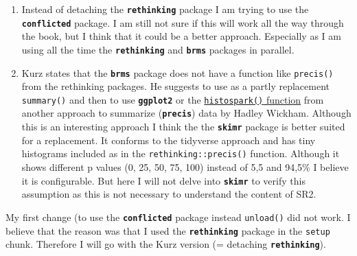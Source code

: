 \documentclass[
  letterpaper,
  DIV=11,
  numbers=noendperiod]{scrreprt}
\providecommand{\tightlist}{%
  \setlength{\itemsep}{0pt}\setlength{\parskip}{0pt}}\usepackage{longtable,booktabs,array}
\begin{document}
\begin{enumerate}
\def\labelenumi{\arabic{enumi}.}
\tightlist
\item
  Instead of detaching the \textbf{\texttt{rethinking}} package I am
  trying to use the \textbf{\texttt{conflicted}} package. I am still not
  sure if this will work all the way through the book, but I think that
  it could be a better approach. Especially as I am using all the time
  the \textbf{\texttt{rethinking}} and \textbf{\texttt{brms}} packages
  in parallel.
\item
  Kurz states that the \textbf{\texttt{brms}} package does not have a
  function like \texttt{precis()} from the rethinking packages. He
  suggests to use as a partly replacement \texttt{summary()} and then to
  use \textbf{\texttt{ggplot2}} or the
  \href{https://github.com/hadley/precis/blob/master/R/histospark.R}{\texttt{histospark()}
  function} from another approach to summarize
  (\textbf{\texttt{precis}}) data by Hadley Wickham. Although this is an
  interesting approach I think the the \textbf{\texttt{skimr}} package
  is better suited for a replacement. It conforms to the tidyverse
  approach and has tiny histograms included as in the
  \texttt{rethinking::precis()} function. Although it shows different p
  values (0, 25, 50, 75, 100) instead of 5,5 and 94,5\% I believe it is
  configurable. But here I will not delve into \textbf{\texttt{skimr}}
  to verify this assumption as this is not necessary to understand the
  content of SR2.
\end{enumerate}

\begin{tcolorbox}[enhanced jigsaw, colframe=quarto-callout-warning-color-frame, colback=white, toprule=.15mm, breakable, arc=.35mm, bottomtitle=1mm, colbacktitle=quarto-callout-warning-color!10!white, toptitle=1mm, titlerule=0mm, title=\textcolor{quarto-callout-warning-color}{\faExclamationTriangle}\hspace{0.5em}{Function conflicts}, leftrule=.75mm, opacityback=0, rightrule=.15mm, opacitybacktitle=0.6, bottomrule=.15mm, left=2mm, coltitle=black]

My first change (to use the \textbf{\texttt{conflicted}} package instead
\texttt{unload()} did not work. I believe that the reason was that I
used the \textbf{\texttt{rethinking}} package in the \texttt{setup}
chunk. Therefore I will go with the Kurz version (= detaching
\textbf{\texttt{rethinking}}).

\end{tcolorbox}
\end{document}
